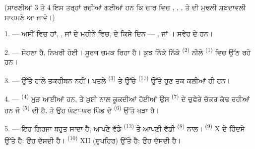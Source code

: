 %

\VUsaut{3.0mm}
\VUsaut{1.6mm}
\VUsaut{3.4mm}

(ਸਾਰਣੀਆਂ 3 ਤੇ 4 ਇਸ ਤਰ੍ਹਾਂ ਰਚੀਆਂ ਗਈਆਂ ਹਨ ਕਿ ਚਾਰ  ਵਿਚ
, , ,  ਤੇ
 ਦੀ ਮੁਢਲੀ ਸ਼ਬਦਾਵਲੀ ਸਾਹਮਣੇ ਆ ਜਾਵੇ।)
\VUsaut{4.0mm}

\VUsaut{3.0mm}

\VUsaut{2.4mm}

\VUsaut{3.0mm}

1. --- ਅਸੀਂ  ਵਿਚ ਹਾਂ, ,  ਜਾਂ
 ਦੇ ਮਹੀਨੇ ਵਿਚ,  ਦੇ ਕਿਸੇ ਦਿਨ --- ,
 ਜਾਂ । ਸਵੇਰ ਦੇ  ਹਨ।

2. ---  ਸੋਹਣਾ ਹੈ,  ਨਿਖਰੀ ਹੋਈ। ਸੂਰਜ ਚਮਕ ਰਿਹਾ ਹੈ। ਕੁਝ
ਨਿੱਕੇ ਨਿੱਕੇ  \textsuperscript{(2)} ਨੀਲੇ 
\textsuperscript{(1)} ਵਿਚ ਉੱਠ ਰਹੇ ਹਨ।

3. ---  ਉੱਤੇ ਹਾਲੇ  ਤਕਰੀਬਨ ਨਹੀਂ। ਪਤਲੇ
 \textsuperscript{(3)} ਤੇ ਉੱਚੇ  \textsuperscript{(17)}
ਉੱਤੇ ਹੁਣ ਤਕ ਕਲੀਆਂ ਹੀ ਹਨ।

4. ---  \textsuperscript{(4)} ਮੁੜ ਆਈਆਂ ਹਨ, ਤੇ ਖ਼ੁਸ਼ੀ ਨਾਲ
ਕੂਕਦੀਆਂ ਹੋਈਆਂ ਉਸ  \textsuperscript{(7)} ਦੇ ਚੁਫੇਰੇ ਚੱਕਰ ਕੱਢ ਰਹੀਆਂ
ਹਨ ਜੋ  \textsuperscript{(5)} ਦੀ ਹੈ, ਤੇ ਉਹ ਘੰਟਾ-ਘਰ ਪਿੰਡ ਦੇ
 \textsuperscript{(6)} ਉੱਤੇ ਖੜਾ ਹੈ।

\VUsaut{3.4mm}
\VUsaut{3.0mm}

5. --- ਇਹ ਗਿਰਜਾ ਬਹੁਤ ਸਾਦਾ ਹੈ, ਆਪਣੇ ਵੱਡੇ  \textsuperscript{(13)}
ਤੇ ਆਪਣੀ ਵੱਡੀ  \textsuperscript{(8)} ਨਾਲ। 
\textsuperscript{(9)} X ਦੇ ਹਿੰਦਸੇ ਉੱਤੇ ਹੈ: ਉਹ  ਦੱਸਦੀ ਹੈ।
 \textsuperscript{(10)} XII (ਦੁਪਹਿਰ) ਉੱਤੇ ਹੈ; ਉਹ
 ਦੱਸਦੀ ਹੈ।

